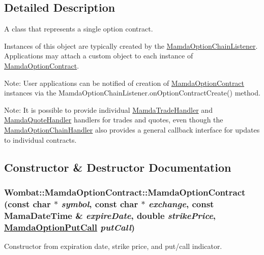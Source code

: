 \subsection{Detailed Description}
A class that represents a single option contract. 

Instances of this object are typically created by the \hyperlink{classWombat_1_1MamdaOptionChainListener}{Mamda\-Option\-Chain\-Listener}. Applications may attach a custom object to each instance of \hyperlink{classWombat_1_1MamdaOptionContract}{Mamda\-Option\-Contract}.

Note: User applications can be notified of creation of \hyperlink{classWombat_1_1MamdaOptionContract}{Mamda\-Option\-Contract} instances via the Mamda\-Option\-Chain\-Listener.on\-Option\-Contract\-Create() method.

Note: It is possible to provide individual \hyperlink{classWombat_1_1MamdaTradeHandler}{Mamda\-Trade\-Handler} and \hyperlink{classWombat_1_1MamdaQuoteHandler}{Mamda\-Quote\-Handler} handlers for trades and quotes, even though the \hyperlink{classWombat_1_1MamdaOptionChainHandler}{Mamda\-Option\-Chain\-Handler} also provides a general callback interface for updates to individual contracts. 



\subsection{Constructor \& Destructor Documentation}
\hypertarget{classWombat_1_1MamdaOptionContract_9cfb4ec903737947e308c029c7f7d081}{
\subsubsection[MamdaOptionContract]{\setlength{\rightskip}{0pt plus 5cm}Wombat::Mamda\-Option\-Contract::Mamda\-Option\-Contract (const char $\ast$ {\em symbol}, const char $\ast$ {\em exchange}, const Mama\-Date\-Time \& {\em expire\-Date}, double {\em strike\-Price}, \hyperlink{namespaceWombat_ceb2ef77ec6c36b48ef57d2887d6ac49}{Mamda\-Option\-Put\-Call} {\em put\-Call})}}
\label{classWombat_1_1MamdaOptionContract_9cfb4ec903737947e308c029c7f7d081}


Constructor from expiration date, strike price, and put/call indicator. 

